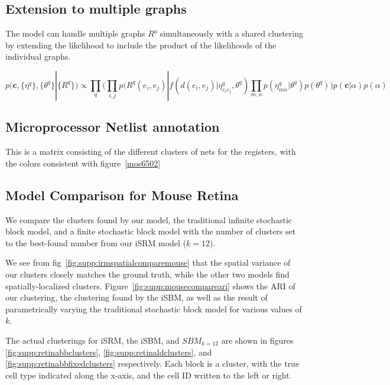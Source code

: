\documentclass{article}
\renewcommand{\vec}[1]{\mathbf{#1}}
\begin{document}
\subsection{Extension to multiple graphs}
\label{supp:multigraph}
The model can handle multiple graphs $R^q$ simultaneously with a shared clustering by extending the likelihood to include the product of the likelihoods of the individual graphs. 

\begin{equation}
  p(\vec{c}, \{\eta^q\}, \{\theta^q\} | \{R^q\} ) \propto \prod_q \Bigg(\prod_{i, j} p(R^q(e_i, e_j) | f(d(e_i, e_j) | \eta^q_{c_ic_j}, \theta^q) \prod_{m, n} p(\eta^q_{mn} | \theta^q)  p(\theta^q) \Bigg) p(\vec{c} | \alpha) p(\alpha) 
\end{equation}

\FloatBarrier

\subsection{Microprocessor Netlist annotation}
\label{supp:mos6502netlist}
This is a matrix consisting of the different clusters of nets for 
the registers, with the colors consistent with figure~\ref{mos6502}



\FloatBarrier
\subsection{Model Comparison for Mouse Retina}

We compare the clusters found by our model, the traditional infinite
stochastic block model, and a finite stochastic block model with the number
of clusters set to the best-found number from our iSRM model ($k=12$).

We see from fig~\ref{fig:supp:irmspatialcomparemouse} that the spatial
variance of our clusters closely matches the ground truth, while the
other two models find spatially-localized
clusters. Figure~\ref{fig:supp:mousecompareari} shows the ARI of our
clustering, the clustering found by the iSBM,
as well as the result of parametrically varying the traditional stochastic
block model for various values of $k$. 

The actual clusterings for iSRM, the iSBM, and $SBM_{k=12}$ are shown
in figures \ref{fig:supp:retinabbclusters},
\ref{fig:supp:retinaldclusters}, and
\ref{fig:supp:retinabbfixedclusters} respectively. Each block is a
cluster, with the true cell type indicated along the x-axis, and the
cell ID written to the left or right.
\end{document}
